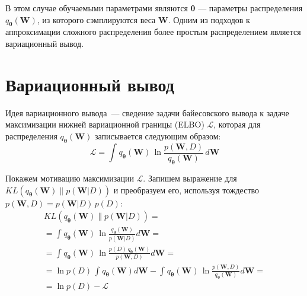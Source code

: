 \documentclass{article}
\numberwithin{equation}{section}
\begin{document}
    В этом случае обучаемыми параметрами являются $\pmb{\theta}$
    --- параметры распределения $q_{\pmb{\theta}}(\pmb{W})$,
    из которого сэмплируются веса $\pmb{W}$.
    Одним из подходов к аппроксимации сложного распределения более простым
    распределением является вариационный вывод.

    \section{Вариационный вывод}

    Идея вариационного вывода~--- сведение задачи байесовского вывода
    к задаче максимизации нижней вариационной границы (ELBO) $\mathcal{L}$,
    которая для распределения $q_{\pmb{\theta}}(\pmb{W})$
    записывается следующим образом:
    \begin{equation}
        \mathcal{L}
        =
            \int_{}{
                q_{\pmb{\theta}}(\pmb{W})
                \,
                \ln{
                    \frac
                        {p(\pmb{W}, D)}
                        {q_{\pmb{\theta}}(\pmb{W})}
                }
                \,
                d\pmb{W}
            }
    \end{equation}

    Покажем мотивацию максимизации $\mathcal{L}$.
    Запишем выражение для
    $
    KL(
        q_{\pmb{\theta}}(\pmb{W})
        \parallel
        p(\pmb{W}| D)
    )
    $
    и преобразуем его, используя тождество $p(\pmb{W}, D) = p(\pmb{W}| D) \, p(D)$:
    \begin{equation}
    \begin{split}
        KL(
            q_{\pmb{\theta}}(\pmb{W})
            \parallel
            p(\pmb{W}| D)
        ) = \\
        =
            \int_{}{
                q_{\pmb{\theta}}(\pmb{W})
                \,
                \ln{
                    \frac
                        {
                            q_{\pmb{\theta}}(\pmb{W})
                        }
                        {p(\pmb{W} | D)}
                }
                d\pmb{W}
            }
        = \\
        =
            \int_{}{
                q_{\pmb{\theta}}(\pmb{W})
                \,
                \ln{
                    \frac
                        {
                            p(D)
                            \,
                            q_{\pmb{\theta}}(\pmb{W})
                        }
                        {p(\pmb{W}, D)}
                }
                d\pmb{W}
            }
        = \\
        =
            \ln{p(D)}
            \,
            \int_{}{
                q_{\pmb{\theta}}(\pmb{W}) d\pmb{W}
            }
            -
            \int_{}{
                q_{\pmb{\theta}}(\pmb{W})
                \,
                \ln{
                    \frac
                        {p(\pmb{W}, D)}
                        {q_{\pmb{\theta}}(\pmb{W})}
                }
                d\pmb{W}
            }
        = \\
        =
            \ln{p(D)} - \mathcal{L}
    \end{split}
    \end{equation}
\end{document}
